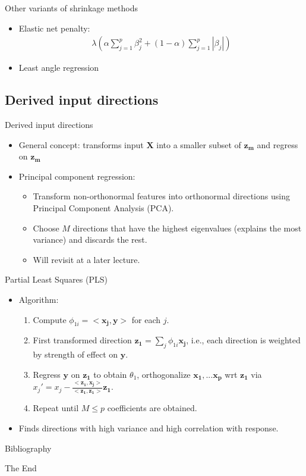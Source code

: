 \documentclass{beamer}
\let \vec \mathbf
\begin{document}
\begin{frame}{Other variants of shrinkage methods}
    \begin{itemize}
        \item Elastic net penalty:
        \begin{eqnarray*}
            \lambda \left( \alpha \sum_{j=1}^p \beta_j^2+ (1-\alpha) \sum_{j=1}^p |\beta_j| \right)
        \end{eqnarray*}
        \item Least angle regression
    \end{itemize}
\end{frame}


\subsection{Derived input directions}

\begin{frame}{Derived input directions}
    \begin{itemize}
        \item General concept: transforms input $\vec{X}$ into a smaller subset of $\vec{z_m}$ and regress on $\vec{z_m}$
        \item Principal component regression:
        \begin{itemize}
            \item Transform non-orthonormal features into orthonormal directions using Principal Component Analysis (PCA).
            \item Choose $M$ directions that have the highest eigenvalues (explains the most variance) and discards the rest.
            \item Will revisit at a later lecture.
        \end{itemize}
    \end{itemize}
\end{frame} 


\begin{frame}{Partial Least Squares (PLS)}
    \begin{itemize}
        \item Algorithm:
        \begin{enumerate}
            \item Compute $\phi_{1i} = <\vec{x_j}, \vec{y}>$ for each $j$.
            \item First transformed direction $\vec{z_1} = \sum_j \phi_{1i} \vec{x_j}$, i.e., each direction is weighted by strength of effect on $\vec{y}$.
            \item Regress $\vec{y}$ on $\vec{z_1}$ to obtain $\theta_1$, orthogonalize $\vec{x_1}, ... \vec{x_p}$ wrt $\vec{z_1}$ via $x_j' = x_j - \frac{<\vec{z_1}, \vec{x_j}>}{<\vec{z_1}, \vec{z_1}>}\vec{z_1}$.
            \item Repeat until $M \leq p$ coefficients are obtained.
        \end{enumerate}
        \item Finds directions with high variance and high correlation with response.
    \end{itemize}
\end{frame} 


\begin{frame}{Bibliography}
    
    
\end{frame}


\begin{frame}
    \Huge{\centerline{The End}}
\end{frame}
\end{document}
